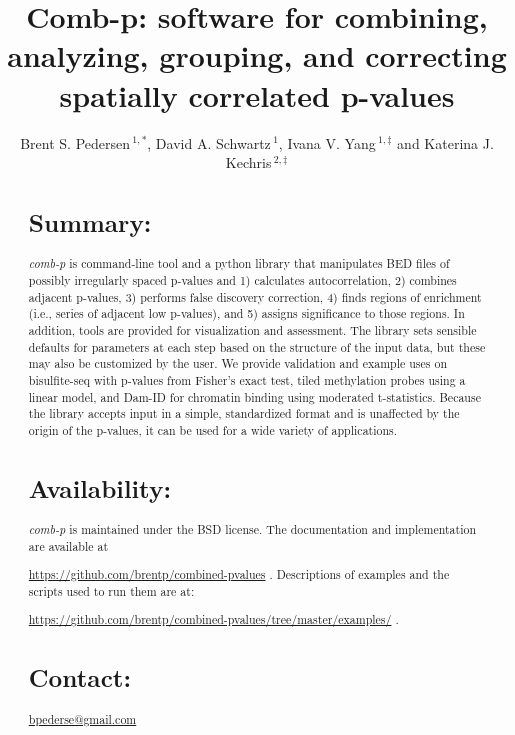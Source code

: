 \documentclass{bioinfo}
\begin{document}

\title[comb-p]{Comb-p: software for combining, analyzing, grouping, and correcting spatially correlated p-values}
\author[Pedersen \textit{et~al}]{Brent S. Pedersen\,$^{1,*}$,
 David A. Schwartz\,$^{1}$,
    Ivana V. Yang\,$^{1,‡}$
and Katerina J.  Kechris\,$^{2,‡}$}
\address{$^{1}$Department of Medicine, University of Colorado, Denver, Anschutz Medical Campus, Aurora CO 80045,
USA\\
$^{2}$Department of Statistics, University of Colorado, Denver, Anschutz Medical Campus, Aurora CO 80045, USA\\
}
\maketitle
\begin{abstract}

\section{Summary:}
\textit{comb-p} is command-line tool and a python library that
manipulates BED files of possibly irregularly spaced p-values and
1) calculates autocorrelation,
2) combines adjacent p-values,
3) performs false discovery correction,
4) finds regions of enrichment (i.e., series of adjacent low p-values), and
5) assigns significance to those regions.
In addition, tools are provided for visualization and
assessment. The library sets sensible defaults for parameters at each
step based on the structure of the input data, but these may also be customized
by the user. We provide validation and example uses on bisulfite-seq with p-values
from Fisher's exact test,
tiled methylation probes using a linear model, and Dam-ID for chromatin binding
using moderated t-statistics. Because the library
accepts input in a simple, standardized format and is unaffected by the origin
of the p-values, it can be used for a wide variety of applications.

\section{Availability:}
\textit{comb-p} is maintained under the BSD license. The documentation and
implementation are available at

\href{https://github.com/brentp/combined-pvalues}{https://github.com/brentp/combined-pvalues} .
Descriptions of examples and the scripts used to run them are at:

\href{https://github.com/brentp/combined-pvalues/tree/master/examples/}{https://github.com/brentp/combined-pvalues/tree/master/examples/} 
.

\section{Contact:} \href{bpederse@gmail.com}{bpederse@gmail.com}

\end{abstract}
\end{document}
